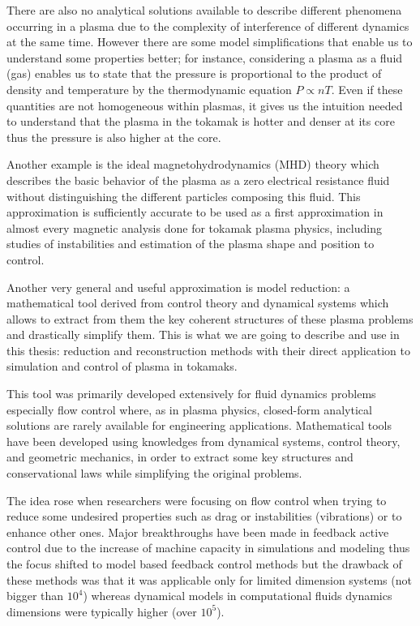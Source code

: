 \documentclass[12pt,lot, lof]{puthesis}
\begin{document}
There are also no analytical solutions available to describe different phenomena occurring in a plasma due to the complexity of interference of different dynamics at the same time. However there are some model simplifications that enable us to understand some properties better; for instance, considering a plasma as a fluid (gas) enables us to state that the pressure is proportional to the product of density and temperature by the thermodynamic equation $P \propto n T$. Even if these quantities are not homogeneous within plasmas, it gives us the intuition needed to understand that the plasma in the tokamak is hotter and denser at its core thus the pressure is also higher at the core.

Another example is the ideal magnetohydrodynamics (MHD) theory which describes the basic behavior of the plasma as a zero electrical resistance fluid without distinguishing the different particles composing this fluid. This approximation is sufficiently accurate to be used as
a first approximation in almost every magnetic analysis done for tokamak plasma physics, including studies of instabilities and estimation of the plasma shape and position to control.

Another very general and useful approximation is model reduction: a mathematical tool derived from control theory and dynamical systems which allows to extract from them the key coherent structures of these plasma problems and drastically simplify them. This is what we are going to describe and use in this thesis: reduction and reconstruction methods with their direct application to simulation and control of plasma in tokamaks.

This tool was primarily developed extensively for fluid dynamics problems especially flow control where, as in plasma physics, closed-form analytical solutions are rarely available for engineering applications. Mathematical tools have been developed using knowledges from dynamical systems, control theory, and geometric mechanics, in order to extract some key structures and conservational laws while simplifying the original problems.

The idea rose when researchers were focusing on flow control when trying to reduce some undesired properties such as drag or instabilities (vibrations) or to enhance other ones. Major breakthroughs have been made in feedback active control due to the increase of machine capacity in simulations and modeling \cite{ Kim07, Cattafesta08, Choi07, Sipp10} thus the focus shifted to model based feedback control methods but the drawback of these methods was that it was applicable only for limited dimension systems (not bigger than $10^4$) whereas dynamical models in computational fluids dynamics dimensions were typically higher (over $10^5$). 
\end{document}
